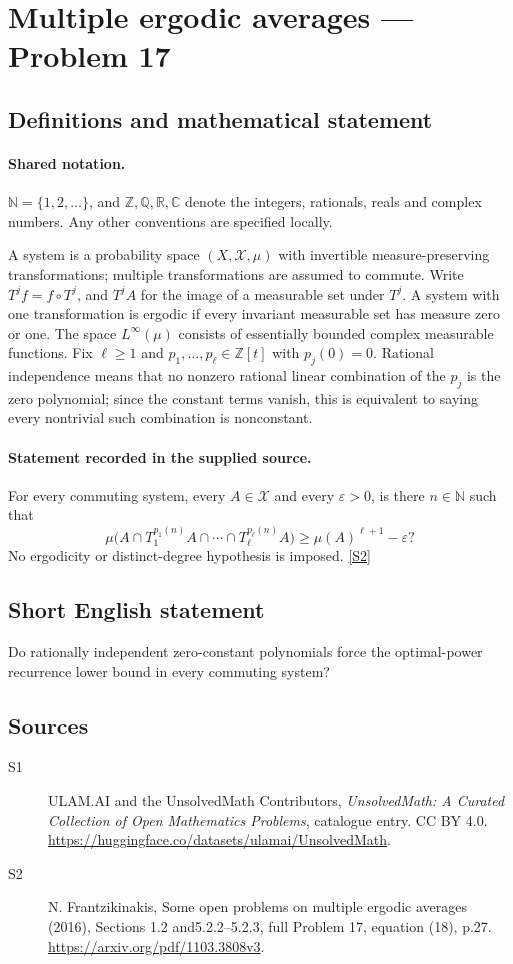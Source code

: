\documentclass[11pt]{article}
\newcommand{\sref}[2]{\hyperlink{source:#1:#2}{[S#2]}}
\begin{document}
\section{Multiple ergodic averages — Problem 17}\label{statement}

\subsection{Definitions and mathematical statement}

\paragraph{Shared notation.}$\mathbb N=\{1,2,\ldots\}$, and $\mathbb Z,\mathbb Q,\mathbb R,\mathbb C$ denote the integers, rationals, reals and complex numbers. Any other conventions are specified locally.


A system is a probability space $(X,\mathcal X,\mu)$ with invertible measure-preserving transformations; multiple transformations are assumed to commute. Write $T^j f=f\circ T^j$, and $T^j A$ for the image of a measurable set under $T^j$. A system with one transformation is ergodic if every invariant measurable set has measure zero or one. The space $L^\infty(\mu)$ consists of essentially bounded complex measurable functions. Fix $\ell\ge1$ and $p_1,\ldots,p_\ell\in\mathbb Z[t]$ with $p_j(0)=0$. Rational independence means that no nonzero rational linear combination of the $p_j$ is the zero polynomial; since the constant terms vanish, this is equivalent to saying every nontrivial such combination is nonconstant.
\paragraph{Statement recorded in the supplied source.}
For every commuting system, every $A\in\mathcal X$ and every $\varepsilon>0$, is there $n\in\mathbb N$ such that \[\mu\bigl(A\cap T_1^{p_1(n)}A\cap\cdots\cap T_\ell^{p_\ell(n)}A\bigr)\ge\mu(A)^{\ell+1}-\varepsilon?\] No ergodicity or distinct-degree hypothesis is imposed. \sref{statement}{2}
\subsection{Short English statement}
Do rationally independent zero-constant polynomials force the optimal-power recurrence lower bound in every commuting system?
\subsection{Sources}
\begin{description}
\item[\hypertarget{source:statement:1}{S1}] ULAM.AI and the UnsolvedMath Contributors, \emph{UnsolvedMath: A Curated Collection of Open Mathematics Problems}, catalogue entry. CC BY 4.0. \url{https://huggingface.co/datasets/ulamai/UnsolvedMath}.
\item[\hypertarget{source:statement:2}{S2}] N. Frantzikinakis, Some open problems on multiple ergodic averages (2016), Sections 1.2 and5.2.2--5.2.3, full Problem 17, equation (18), p.27. \url{https://arxiv.org/pdf/1103.3808v3}.
\end{description}
\label{end:statement}
\end{document}
